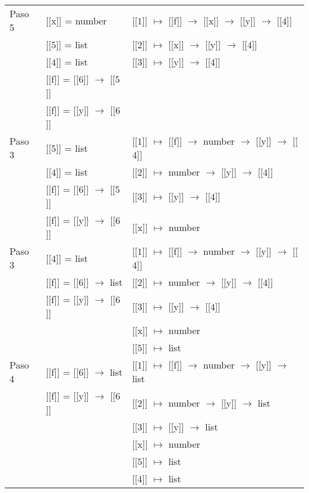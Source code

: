 \documentclass[12pt]{article}
\begin{document}
\begin{center}
\begin{longtable}{ | l | p{10 cm} | p{5 cm} | }
        Paso 5 & [[x]] = number & [[$\boxed{1}$]] $\mapsto$ [[f]] $\rightarrow$ [[x]] $\rightarrow$ [[y]] $\rightarrow$ [[$\boxed{4}$]] \\
        & [[$\boxed{5}$]] = list & [[$\boxed{2}$]] $\mapsto$ [[x]] $\rightarrow$ [[y]] $\rightarrow$ [[$\boxed{4}$]] \\
        & [[$\boxed{4}$]] = list & [[$\boxed{3}$]] $\mapsto$ [[y]] $\rightarrow$ [[$\boxed{4}$]] \\
        & [[f]] = [[$\boxed{6}$]] $\rightarrow$ [[$\boxed{5}$]] & \\
        & [[f]] = [[y]] $\rightarrow$ [[$\boxed{6}$]] & \\ \hline
        
        Paso 3 & [[$\boxed{5}$]] = list & [[$\boxed{1}$]] $\mapsto$ [[f]] $\rightarrow$ number $\rightarrow$ [[y]] $\rightarrow$ [[$\boxed{4}$]] \\
        & [[$\boxed{4}$]] = list & [[$\boxed{2}$]] $\mapsto$ number $\rightarrow$ [[y]] $\rightarrow$ [[$\boxed{4}$]] \\
        & [[f]] = [[$\boxed{6}$]] $\rightarrow$ [[$\boxed{5}$]] & [[$\boxed{3}$]] $\mapsto$ [[y]] $\rightarrow$ [[$\boxed{4}$]] \\
        & [[f]] = [[y]] $\rightarrow$ [[$\boxed{6}$]] & [[x]] $\mapsto$ number \\ \hline
        
        Paso 3 & [[$\boxed{4}$]] = list & [[$\boxed{1}$]] $\mapsto$ [[f]] $\rightarrow$ number $\rightarrow$ [[y]] $\rightarrow$ [[$\boxed{4}$]] \\
        & [[f]] = [[$\boxed{6}$]] $\rightarrow$ list & [[$\boxed{2}$]] $\mapsto$ number $\rightarrow$ [[y]] $\rightarrow$ [[$\boxed{4}$]] \\
        & [[f]] = [[y]] $\rightarrow$ [[$\boxed{6}$]] & [[$\boxed{3}$]] $\mapsto$ [[y]] $\rightarrow$ [[$\boxed{4}$]] \\
        & & [[x]] $\mapsto$ number \\
        & & [[$\boxed{5}$]] $\mapsto$ list \\ \hline
  
        Paso 4 & [[f]] = [[$\boxed{6}$]] $\rightarrow$ list & [[$\boxed{1}$]] $\mapsto$ [[f]] $\rightarrow$ number $\rightarrow$ [[y]] $\rightarrow$ list \\
        & [[f]] = [[y]] $\rightarrow$ [[$\boxed{6}$]] & [[$\boxed{2}$]] $\mapsto$ number $\rightarrow$ [[y]] $\rightarrow$ list \\
        & & [[$\boxed{3}$]] $\mapsto$ [[y]] $\rightarrow$ list \\
        & & [[x]] $\mapsto$ number \\
        & & [[$\boxed{5}$]] $\mapsto$ list \\
        & & [[$\boxed{4}$]] $\mapsto$ list \\ \hline
     

\end{longtable}
\end{center}
\end{document}
